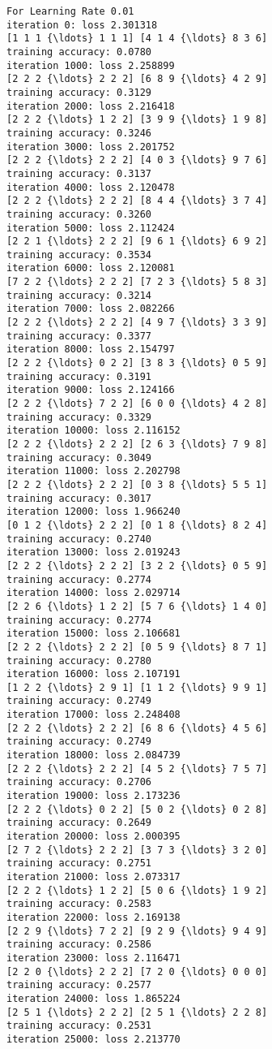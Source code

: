 \documentclass[11pt]{article}
\begin{document}
\begin{Verbatim}[commandchars=\\\{\}]
For Learning Rate 0.01
iteration 0: loss 2.301318
[1 1 1 {\ldots} 1 1 1] [4 1 4 {\ldots} 8 3 6]
training accuracy: 0.0780
iteration 1000: loss 2.258899
[2 2 2 {\ldots} 2 2 2] [6 8 9 {\ldots} 4 2 9]
training accuracy: 0.3129
iteration 2000: loss 2.216418
[2 2 2 {\ldots} 1 2 2] [3 9 9 {\ldots} 1 9 8]
training accuracy: 0.3246
iteration 3000: loss 2.201752
[2 2 2 {\ldots} 2 2 2] [4 0 3 {\ldots} 9 7 6]
training accuracy: 0.3137
iteration 4000: loss 2.120478
[2 2 2 {\ldots} 2 2 2] [8 4 4 {\ldots} 3 7 4]
training accuracy: 0.3260
iteration 5000: loss 2.112424
[2 2 1 {\ldots} 2 2 2] [9 6 1 {\ldots} 6 9 2]
training accuracy: 0.3534
iteration 6000: loss 2.120081
[7 2 2 {\ldots} 2 2 2] [7 2 3 {\ldots} 5 8 3]
training accuracy: 0.3214
iteration 7000: loss 2.082266
[2 2 2 {\ldots} 2 2 2] [4 9 7 {\ldots} 3 3 9]
training accuracy: 0.3377
iteration 8000: loss 2.154797
[2 2 2 {\ldots} 0 2 2] [3 8 3 {\ldots} 0 5 9]
training accuracy: 0.3191
iteration 9000: loss 2.124166
[2 2 2 {\ldots} 7 2 2] [6 0 0 {\ldots} 4 2 8]
training accuracy: 0.3329
iteration 10000: loss 2.116152
[2 2 2 {\ldots} 2 2 2] [2 6 3 {\ldots} 7 9 8]
training accuracy: 0.3049
iteration 11000: loss 2.202798
[2 2 2 {\ldots} 2 2 2] [0 3 8 {\ldots} 5 5 1]
training accuracy: 0.3017
iteration 12000: loss 1.966240
[0 1 2 {\ldots} 2 2 2] [0 1 8 {\ldots} 8 2 4]
training accuracy: 0.2740
iteration 13000: loss 2.019243
[2 2 2 {\ldots} 2 2 2] [3 2 2 {\ldots} 0 5 9]
training accuracy: 0.2774
iteration 14000: loss 2.029714
[2 2 6 {\ldots} 1 2 2] [5 7 6 {\ldots} 1 4 0]
training accuracy: 0.2774
iteration 15000: loss 2.106681
[2 2 2 {\ldots} 2 2 2] [0 5 9 {\ldots} 8 7 1]
training accuracy: 0.2780
iteration 16000: loss 2.107191
[1 2 2 {\ldots} 2 9 1] [1 1 2 {\ldots} 9 9 1]
training accuracy: 0.2749
iteration 17000: loss 2.248408
[2 2 2 {\ldots} 2 2 2] [6 8 6 {\ldots} 4 5 6]
training accuracy: 0.2749
iteration 18000: loss 2.084739
[2 2 2 {\ldots} 2 2 2] [4 5 2 {\ldots} 7 5 7]
training accuracy: 0.2706
iteration 19000: loss 2.173236
[2 2 2 {\ldots} 0 2 2] [5 0 2 {\ldots} 0 2 8]
training accuracy: 0.2649
iteration 20000: loss 2.000395
[2 7 2 {\ldots} 2 2 2] [3 7 3 {\ldots} 3 2 0]
training accuracy: 0.2751
iteration 21000: loss 2.073317
[2 2 2 {\ldots} 1 2 2] [5 0 6 {\ldots} 1 9 2]
training accuracy: 0.2583
iteration 22000: loss 2.169138
[2 2 9 {\ldots} 7 2 2] [9 2 9 {\ldots} 9 4 9]
training accuracy: 0.2586
iteration 23000: loss 2.116471
[2 2 0 {\ldots} 2 2 2] [7 2 0 {\ldots} 0 0 0]
training accuracy: 0.2577
iteration 24000: loss 1.865224
[2 5 1 {\ldots} 2 2 2] [2 5 1 {\ldots} 2 2 8]
training accuracy: 0.2531
iteration 25000: loss 2.213770

\end{Verbatim}
\end{document}
